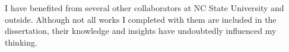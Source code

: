 \begin{acknowledgements}
I have benefited from several other collaborators at NC State University and outside. 
Although not all works I completed with them are included in the dissertation, their knowledge and insights have undoubtedly influenced
my thinking. 
%

\end{acknowledgements}

